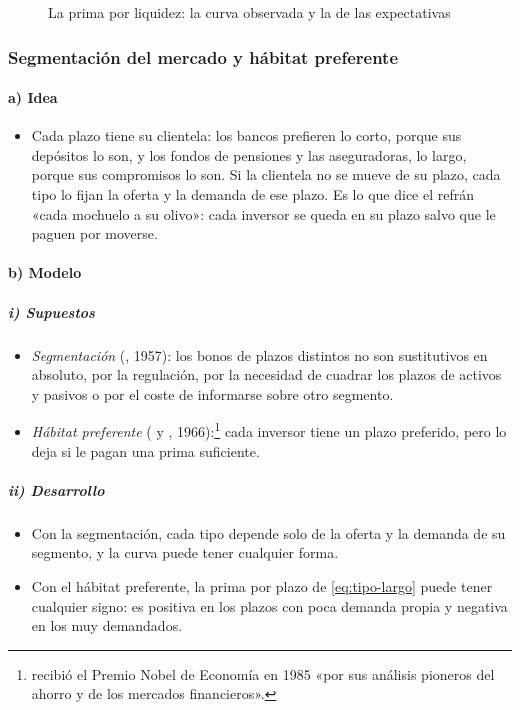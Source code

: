 \documentclass[11pt]{article}
\begin{document}
\begin{figure}[H]
\centering
\caption{La prima por liquidez: la curva observada y la de las expectativas}\label{fig:prima-liquidez}
\end{figure}

\subsubsection{Segmentación del mercado y hábitat preferente}\label{sec:habitat}

\paragraph{a) Idea}
\begin{itemize}
\item Cada plazo tiene su clientela: los bancos prefieren lo corto, porque sus depósitos lo son, y los fondos de pensiones y las aseguradoras, lo largo, porque sus compromisos lo son. Si la clientela no se mueve de su plazo, cada tipo lo fijan la oferta y la demanda de ese plazo. Es lo que dice el refrán «cada mochuelo a su olivo»: cada inversor se queda en su plazo salvo que le paguen por moverse.
\end{itemize}

\paragraph{b) Modelo}
\subparagraph{i) Supuestos}
\begin{itemize}
\item \emph{Segmentación} (, 1957)\nocite{Culbertson1957Term}: los bonos de plazos distintos no son sustitutivos en absoluto, por la regulación, por la necesidad de cuadrar los plazos de activos y pasivos o por el coste de informarse sobre otro segmento.
\item \emph{Hábitat preferente} ( y , 1966)\nocite{ModiglianiSutch1966Innovations}:\footnote{ recibió el Premio Nobel de Economía en 1985 «por sus análisis pioneros del ahorro y de los mercados financieros»\nocite{Nobel1985Modigliani}.} cada inversor tiene un plazo preferido, pero lo deja si le pagan una prima suficiente.
\end{itemize}

\subparagraph{ii) Desarrollo}
\begin{itemize}
\item Con la segmentación, cada tipo depende solo de la oferta y la demanda de su segmento, y la curva puede tener cualquier forma.
\item Con el hábitat preferente, la prima por plazo de \eqref{eq:tipo-largo} puede tener cualquier signo: es positiva en los plazos con poca demanda propia y negativa en los muy demandados.
\end{itemize}
\end{document}
